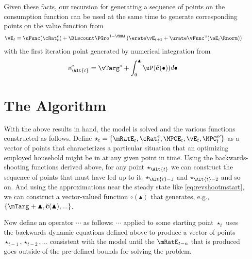 \documentclass{\handout}
\begin{document}
Given these facts, our recursion for generating a sequence of points on the consumption
function can be used at the same time to generate corresponding points on the value function from
\begin{equation}\begin{gathered}\begin{aligned}
  \vE_{t} & =  \uFunc({\cRat}^{e}_{t})+\Discount \PGro^{1-\CRRA} \left(\erate \vE_{t+1} + \urate \vFunc^{u}(\aE_{t} \Rnorm)\right)
\end{aligned}\end{gathered}\end{equation}
with the first iteration point generated by numerical integration from 
\begin{equation}\begin{gathered}\begin{aligned}
  v^{e}_{\Alt{t}} & =  \vTarg^{e}+\int_{0}^{\blacktriangle} \uP(\tilde{\mathbf{c}}(\bullet)) d\bullet
\end{aligned}\end{gathered}\end{equation}



\section{The Algorithm}

With the above results in hand, the model is solved and the various
functions constructed as follows.  Define $\star_{t} =
\{\mRatE_{t},{\cRat}^{e}_{t},\MPCE_{t},\vE_{t},\MPC_{t}^{e\prime}\}$ as a vector of points that
characterizes a particular situation that an optimizing employed
household might be in at any given point in time.  Using the backwards-shooting 
functions derived above, for any point $\star_{\Alt{t}}$ we can construct the
sequence of points that must have led up to it: $\star_{\Alt{t}-1}$ and
$\star_{\Alt{t}-2}$ and so on.  And using the approximations near the
steady state like \eqref{eq:revshootmstart}, we can construct 
a vector-valued function $\pmb{\circ}(\blacktriangle)$ that generates, 
e.g., $\{\mTarg^{\hideSup}+\blacktriangle,\tilde{\mathbf{c}}(\blacktriangle), ... \}$.


Now define an operator $\cdots$ as follows: $\cdots$ applied to some
starting point $\star_{t}$ uses the backwards dynamic equations
defined above to produce a vector of points
$\star_{t-1},\star_{t-2},...$ consistent with the model until the
$\mRatE_{t-n}$ that is produced goes outside of the pre-defined bounds
for solving the problem.
\end{document}
